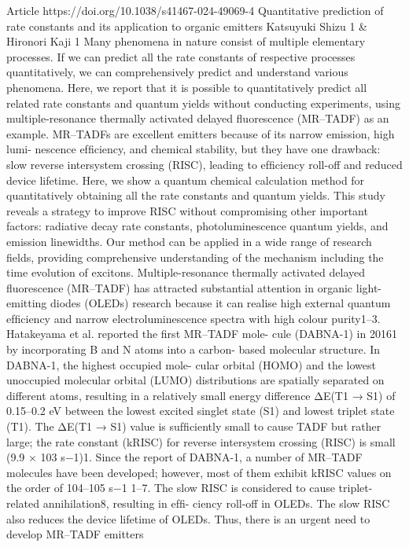 Article
https://doi.org/10.1038/s41467-024-49069-4
Quantitative prediction of rate constants and
its application to organic emitters
Katsuyuki Shizu
1 & Hironori Kaji
1
Many phenomena in nature consist of multiple elementary processes. If we can
predict all the rate constants of respective processes quantitatively, we can
comprehensively predict and understand various phenomena. Here, we report
that it is possible to quantitatively predict all related rate constants and
quantum yields without conducting experiments, using multiple-resonance
thermally activated delayed ﬂuorescence (MR–TADF) as an example.
MR–TADFs are excellent emitters because of its narrow emission, high lumi-
nescence efﬁciency, and chemical stability, but they have one drawback: slow
reverse intersystem crossing (RISC), leading to efﬁciency roll-off and reduced
device lifetime. Here, we show a quantum chemical calculation method for
quantitatively obtaining all the rate constants and quantum yields. This study
reveals a strategy to improve RISC without compromising other important
factors: radiative decay rate constants, photoluminescence quantum yields,
and emission linewidths. Our method can be applied in a wide range of
research ﬁelds, providing comprehensive understanding of the mechanism
including the time evolution of excitons.
Multiple-resonance
thermally
activated
delayed
ﬂuorescence
(MR–TADF) has attracted substantial attention in organic light-
emitting diodes (OLEDs) research because it can realise high external
quantum efﬁciency and narrow electroluminescence spectra with high
colour purity1–3. Hatakeyama et al. reported the ﬁrst MR–TADF mole-
cule (DABNA-1) in 20161 by incorporating B and N atoms into a carbon-
based molecular structure. In DABNA-1, the highest occupied mole-
cular orbital (HOMO) and the lowest unoccupied molecular orbital
(LUMO) distributions are spatially separated on different atoms,
resulting in a relatively small energy difference ΔE(T1 → S1) of
0.15–0.2 eV between the lowest excited singlet state (S1) and lowest
triplet state (T1). The ΔE(T1 → S1) value is sufﬁciently small to cause
TADF but rather large; the rate constant (kRISC) for reverse intersystem
crossing (RISC) is small (9.9 × 103 s−1)1. Since the report of DABNA-1, a
number of MR–TADF molecules have been developed; however, most
of them exhibit kRISC values on the order of 104–105 s−1 1–7. The slow RISC
is considered to cause triplet-related annihilation8, resulting in efﬁ-
ciency roll-off in OLEDs. The slow RISC also reduces the device lifetime
of OLEDs. Thus, there is an urgent need to develop MR–TADF emitters
